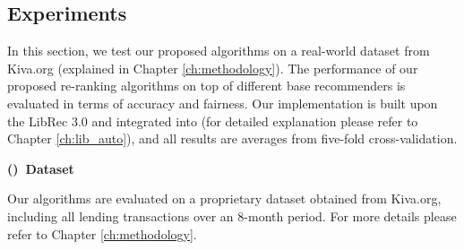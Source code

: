 \subsection{Experiments}
\label{subsect:exp}

In this section, we test our proposed algorithms on a real-world dataset from Kiva.org (explained in Chapter \ref{ch:methodology}). The performance of our proposed re-ranking algorithms on top of different base recommenders is evaluated in terms of accuracy and fairness. Our implementation is built upon the LibRec 3.0 \cite{guo2015librec} and integrated into \libauto{} (for detailed explanation please refer to Chapter \ref{ch:lib_auto}), and all results are averages from five-fold cross-validation.

\vspace{0.25cm}
\noindent \textbf{()~Dataset}
\vspace{0.25cm}

Our algorithms are evaluated on a proprietary dataset obtained from Kiva.org, including all lending transactions over an 8-month period. For more details please refer to Chapter \ref{ch:methodology}.


